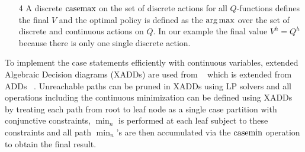\begin{itemize}

\item[4] A discrete $\mathrm{casemax}$ on the set of discrete actions  for all $Q$-functions defines the final $V$ and the optimal policy is defined as the $\argmax$  over the set of discrete and continuous actions on $Q$. In our example the final value $V^h = Q^h$  because there is only one single discrete action. 

\end{itemize}
To implement the case statements efficiently with continuous variables, extended Algebraic Decision diagrams (XADDs) are used from ~\cite{sanner_uai11} which is extended from ADDs ~\cite{bahar93add}. Unreachable paths can be pruned in XADDs using LP solvers and all operations including the continuous minimization can be defined using XADDs by treating each path from root to leaf node as a single case partition with conjunctive constraints,  $\min_n$ is performed at each leaf subject to these constraints and all path $\min_n$'s are then accumulated via the $\mathrm{casemin}$ operation to obtain the final result.

